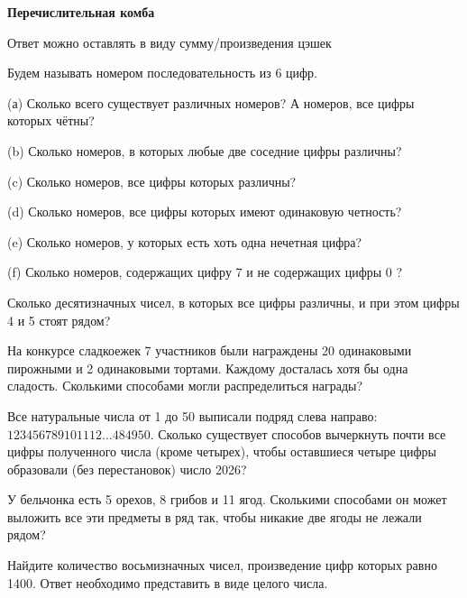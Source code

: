 \centerline{\bf \Huge Перечислительная комба}

\begin{flushright}
        \scriptsize{Ответ можно оставлять в виду сумму/произведения цэшек}
\end{flushright}

Будем называть номером последовательность из 6 цифр.

(а) Сколько всего существует различных номеров? А номеров, все цифры которых чётны?

(b) Сколько номеров, в которых любые две соседние цифры различны?

(c) Сколько номеров, все цифры которых различны?

(d) Сколько номеров, все цифры которых имеют одинаковую четность?

(e) Сколько номеров, у которых есть хоть одна нечетная цифра?

(f) Сколько номеров, содержащих цифру 7 и не содержащих цифры 0 ?


Сколько десятизначных чисел, в которых все цифры различны, и при этом цифры 4 и 5 стоят рядом?

На конкурсе сладкоежек 7 участников были награждены 20 одинаковыми пирожными и 2 одинаковыми тортами. Каждому досталась хотя бы одна сладость. Сколькими способами могли распределиться награды?

Все натуральные числа от 1 до 50 выписали подряд слева направо: $123456789101112 \ldots 484950$. Сколько существует способов вычеркнуть почти все цифры полученного числа (кроме четырех), чтобы оставшиеся четыре цифры образовали (без перестановок) число 2026?

У бельчонка есть 5 орехов, 8 грибов и 11 ягод. Сколькими способами он может выложить все эти предметы в ряд так, чтобы никакие две ягоды не лежали рядом?

Найдите количество восьмизначных чисел, произведение цифр которых равно 1400. Ответ необходимо представить в виде целого числа.

